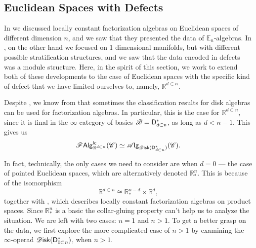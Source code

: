 \documentclass[../text]{subfiles}
\begin{document}
\subsection{Euclidean Spaces with Defects}


In  we discussed locally constant factorization algebras on Euclidean spaces of different dimension $n$, and we saw that they presented the data of $\mathbb{E}_n$-algebras. In , on the other hand we focused on 1 dimensional manifolds, but with different possible stratification structures, and we saw that the data encoded in defects was a module structure. Here, in the spirit of this section, we work to extend both of these developments to the case of Euclidean spaces with the specific kind of defect that we have limited ourselves to, namely, $\mathbb{R}^{d \subset n}$.

Despite , we know from  that sometimes the classification results for disk algebras can be used for factorization algebras. In particular, this is the case for $\mathbb{R}^{d \subset n}$, since it is final in the $\infty$-category of basics $\mathscr{B} = \mathsf{D}_{d \subset n}^*$, as long as $d < n - 1$. This gives us
%
\begin{equation}\label{eq:focus_on_disk_dn}
    \lcfa_{\mathbb{R}^{d \subset n}} (\catC) \simeq \alg{\disk (\mathsf{D}_{d \subset n}^*)} (\catC).
\end{equation}

In fact, technically, the only cases we need to consider are when $d=0$ --- the case of pointed Euclidean spaces, which are alternatively denoted $\mathbb{R}^n_*$. This is because of the isomorphism
%
\begin{equation}
    \mathbb{R}^{d \subset n} \cong \mathbb{R}^{n-d}_* \times \mathbb{R}^d,
\end{equation}
%
together with , which describes locally constant factorization algebras on product spaces. Since $\mathbb{R}^n_*$ is a basic the collar-gluing property  can't help us to analyze the situation. We are left with two cases: $n=1$ and $n > 1$. To get a better grasp on the data, we first explore the more complicated case of $n > 1$ by examining the $\infty$-operad $\disk(\mathsf{D}_{0 \subset n}^*)$, when $n > 1$. 
\end{document}
